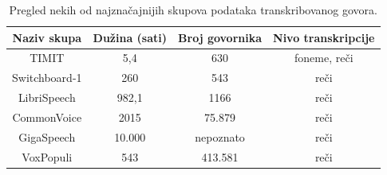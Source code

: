 \documentclass[a4paper]{article}
\begin{document}
\begin{table}[h!]
\begin{center}
  \caption{Pregled nekih od najznačajnijih skupova podataka transkribovanog govora.}
  \begin{tabular}{|c|c|c|c|}
    \hline
    Naziv skupa   & Dužina (sati) & Broj govornika & Nivo transkripcije \\
    \hline
    TIMIT         & 5,4           & 630            & foneme, reči       \\ 
    Switchboard-1 & 260           & 543            & reči               \\ 
    LibriSpeech   & 982,1         & 1166           & reči               \\ 
    CommonVoice   & 2015          & 75.879         & reči               \\
    GigaSpeech    & 10.000        & nepoznato      & reči               \\
    VoxPopuli     & 543           & 413.581        & reči               \\
    \hline
  \end{tabular}
\end{center}
\end{table}
\end{document}
